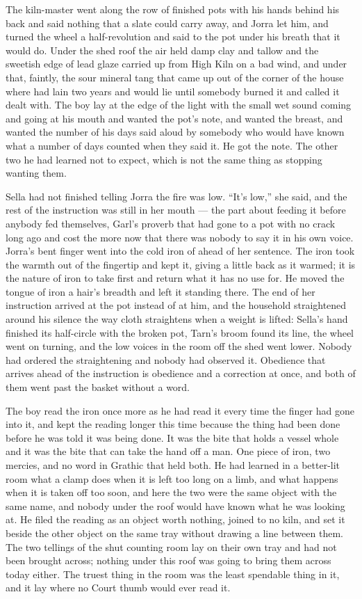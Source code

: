 The kiln-master went along the row of finished pots with his hands behind his back and said nothing that a slate could carry away, and Jorra let him, and turned the wheel a half-revolution and said to the pot under his breath that it would do. Under the shed roof the air held damp clay and tallow and the sweetish edge of lead glaze carried up from High Kiln on a bad wind, and under that, faintly, the sour mineral tang that came up out of the corner of the house where  had lain two years and would lie until somebody burned it and called it dealt with. The boy lay at the edge of the light with the small wet sound coming and going at his mouth and wanted the pot's note, and wanted the breast, and wanted the number of his days said aloud by somebody who would have known what a number of days counted when they said it. He got the note. The other two he had learned not to expect, which is not the same thing as stopping wanting them.

Sella had not finished telling Jorra the fire was low. “It's low,” she said, and the rest of the instruction was still in her mouth --- the part about feeding it before anybody fed themselves, Garl's proverb that had gone to a pot with no crack long ago and cost the more now that there was nobody to say it in his own voice. Jorra's bent finger went into the cold iron of  ahead of her sentence. The iron took the warmth out of the fingertip and kept it, giving a little back as it warmed; it is the nature of iron to take first and return what it has no use for. He moved the tongue of iron a hair's breadth and left it standing there. The end of her instruction arrived at the pot instead of at him, and the household straightened around his silence the way cloth straightens when a weight is lifted: Sella's hand finished its half-circle with the broken pot, Tarn's broom found its line, the wheel went on turning, and the low voices in the room off the shed went lower. Nobody had ordered the straightening and nobody had observed it. Obedience that arrives ahead of the instruction is obedience and a correction at once, and both of them went past the basket without a word.

The boy read the iron once more as he had read it every time the finger had gone into it, and kept the reading longer this time because the thing had been done before he was told it was being done. It was the bite that holds a vessel whole and it was the bite that can take the hand off a man. One piece of iron, two mercies, and no word in Grathic that held both. He had learned in a better-lit room what a clamp does when it is left too long on a limb, and what happens when it is taken off too soon, and here the two were the same object with the same name, and nobody under the roof would have known what he was looking at. He filed the reading as an object worth nothing, joined to no kiln, and set it beside the other object on the same tray without drawing a line between them. The two tellings of the shut counting room lay on their own tray and had not been brought across; nothing under this roof was going to bring them across today either. The truest thing in the room was the least spendable thing in it, and it lay where no Court thumb would ever read it.

